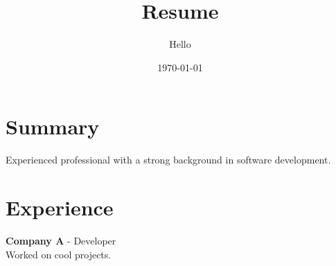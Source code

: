 \documentclass{article}
\title{Resume}
\author{Hello}
\date{\today}
\begin{document}
\maketitle

\section{Summary}
Experienced professional with a strong background in software development.

\section{Experience}
\textbf{Company A} - Developer \\
Worked on cool projects.
\end{document}

